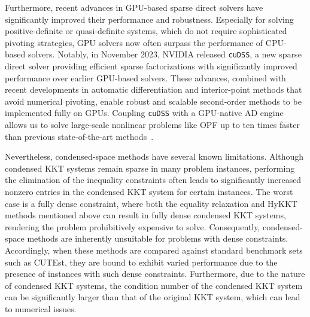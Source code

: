 Furthermore, recent advances in GPU-based sparse direct solvers have significantly improved their performance and robustness.
Especially for solving positive-definite or quasi-definite systems, which do not require sophisticated pivoting strategies, GPU solvers now often surpass the performance of CPU-based solvers.
Notably, in November 2023, NVIDIA released {\tt cuDSS}, a new sparse direct solver providing efficient sparse factorizations with significantly improved performance over earlier GPU-based solvers.
These advances, combined with recent developments in automatic differentiation and interior-point methods that avoid numerical pivoting, enable robust and scalable second-order methods to be implemented fully on GPUs.
Coupling {\tt cuDSS} with a GPU-native AD engine allows us to solve large-scale nonlinear problems like OPF up to ten times faster than previous state-of-the-art methods~\cite{shin2023accelerating}.


Nevertheless, condensed-space methods have several known limitations.
Although condensed KKT systems remain sparse in many problem instances, performing the elimination of the inequality constraints often leads to significantly increased nonzero entries in the condensed KKT system
for certain instances.
The worst case is a fully dense constraint, where both the equality relaxation and HyKKT methods mentioned above can result in fully dense condensed KKT systems, rendering the problem prohibitively expensive to solve.
Consequently, condensed-space methods are inherently unsuitable for problems with dense constraints.
Accordingly, when these methods are compared against standard benchmark sets such as CUTEst, they are bound to exhibit varied performance due to the presence of instances with such dense constraints.
Furthermore, due to the nature of condensed KKT systems, the condition number of the condensed KKT system can be significantly larger than that of the original KKT system, which can lead to numerical issues.

